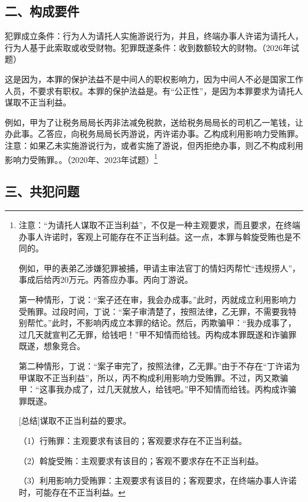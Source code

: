 \subsection*{二、构成要件}

犯罪成立条件：行为人为请托人实施游说行为，并且，终端办事人许诺为请托人，行为人基于此索取或收受财物。犯罪既遂条件：收到数额较大的财物。（2026年试题）

这是因为，本罪的保护法益不是中间人的职权影响力，因为中间人不必是国家工作人员，不要求有职权。本罪的保护法益是。有“公正性”，是因为本罪要求为请托人谋取不正当利益。

例如，甲为了让税务局局长丙非法减免税款，送给税务局局长的司机乙一笔钱，让办此事。乙答应，向税务局局长丙游说，丙许诺办事。乙构成利用影响力受贿罪。注意：如果乙未实施游说行为，或者实施了游说，但丙拒绝办事，则乙不构成利用影响力受贿罪。。（2020年、2023年试题）\footnote{注意：“为请托人谋取不正当利益”，不仅是一种主观要求，而且要求，在终端办事人许诺时，客观上可能存在不正当利益。这一点，本罪与斡旋受贿也是不同的。

例如，甲的表弟乙涉嫌犯罪被捕，甲请主审法官丁的情妇丙帮忙“违规捞人”，事成后给丙20万元。丙答应办事。丙向丁游说。

第一种情形，丁说：“案子还在审，我会办成事。”此时，丙就成立利用影响力受贿罪。过段时间，丁说：“案子审清楚了，按照法律，乙无罪，不需要我特别帮忙。”此时，不影响丙成立本罪的结论。然后，丙欺骗甲：“我办成事了，过几天就宣判乙无罪，给钱吧！”甲不知情而给钱。丙构成本罪既遂和诈骗罪既遂，想象竞合。

第二种情形，丁说：“案子审完了，按照法律，乙无罪。”由于不存在“丁许诺为甲谋取不正当利益”，所以，丙不构成利用影响力受贿罪。不过，丙又欺骗甲：“这事我办成了，过几天就放人，给钱吧。”甲不知情而给钱。丙构成诈骗罪既遂。

[总结]谋取不正当利益的要求。

（1）行贿罪：主观要求有该目的；客观要求存在不正当利益。

（2）斡旋受贿：主观要求有该目的；客观不要求存在不正当利益。

（3）利用影响力受贿罪：主观要求有该目的；客观要求，在终端办事人许诺时，可能存在不正当利益。}

\subsection*{三、共犯问题}

